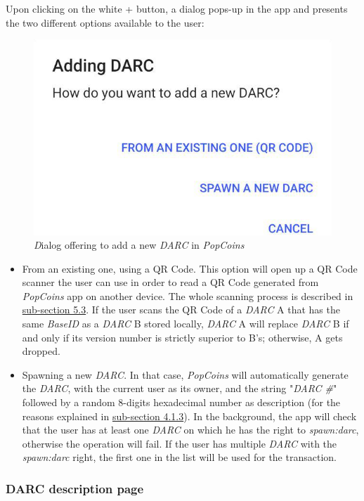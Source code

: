 Upon clicking on the white + button, a dialog pops-up in the app and presents the two different options available to the user:

\begin{figure}[!h]
    \centering
    \includegraphics[height=0.45\linewidth]{Illustrations/screen_adddarc_cropped.png}
    \caption{\textit Dialog offering to add a new \textit{DARC} in \textit{PopCoins}}
\end{figure}

\begin{itemize}
    \item From an existing one, using a QR Code. This option will open up a QR Code scanner the user can use in order to read a QR Code generated from \textit{PopCoins} app on another device. The whole scanning process is described in \hyperref[subsection53]{sub-section 5.3}. If the user scans the QR Code of a \textit{DARC} A that has the same \textit{BaseID} as a \textit{DARC} B stored locally, \textit{DARC} A will replace \textit{DARC} B if and only if its version number is strictly superior to B's; otherwise, A gets dropped.
    \item Spawning a new \textit{DARC}. In that case, \textit{PopCoins} will automatically generate the \textit{DARC}, with the current user as its owner, and the string "\textit{DARC \#}" followed by a random 8-digits hexadecimal number as description (for the reasons explained in \hyperref[subsection413]{sub-section 4.1.3}). In the background, the app will check that the user has at least one \textit{DARC} on which he has the right to \textit{spawn:darc}, otherwise the operation will fail. If the user has multiple \textit{DARC} with the \textit{spawn:darc} right, the first one in the list will be used for the transaction.
\end{itemize}

\subsubsection{DARC description page}

